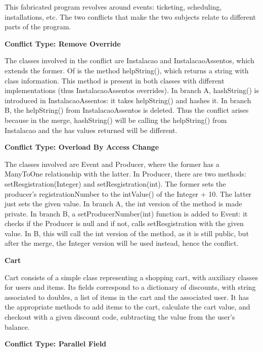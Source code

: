 This fabricated program revolves around events: ticketing, scheduling, installations, etc. The two
conflicts that make the two subjects relate to different parts of the program.

\textbf{Conflict Type: Remove Override}

The classes involved in the conflict are Instalacao and InstalacaoAssentos, which extends the former.
Of is the method helpString(), which returns a string with class information. This method is present
in both classes with different implementations (thus InstalacaoAssentos overrides). In branch A,
hashString() is introduced in InstalacaoAssentos: it takes helpString() and hashes it. In branch B,
the helpString() from InstalacaoAssentos is deleted. Thus the conflict arises because in the merge,
hashString() will be  calling the helpString() from Instalacao and the has values returned will be different.

\textbf{Conflict Type: Overload By Access Change}

The classes involved are Event and Producer, where the former has a ManyToOne relationship with the latter.
In Producer, there are two methods: setResgistration(Integer) and setResgistration(int). The former sets
the producer's registrationNumber to the intValue() of the Integer + 10. The latter just sets the given value.
In branch A, the int version of the method is made private. In branch B, a setProducerNumber(int) function is added
to Event: it checks if the Producer is null and if not, calls setResgistration with the given value. In B, this will
call the int version of the method, as it is still public, but after the merge, the Integer version will be used instead,
hence the conflict.

\textbf{Cart}

Cart consists of a simple class representing a shopping cart, with auxiliary classes for users and items.
Its fields correspond to a dictionary of discounts, with string associated to doubles, a list of items in the cart
and the associated user.
It has the appropriate methods to add items to the cart, calculate the cart value, and checkout with a given discount code,
subtracting the value from the user's balance.

\textbf{Conflict Type: Parallel Field}


